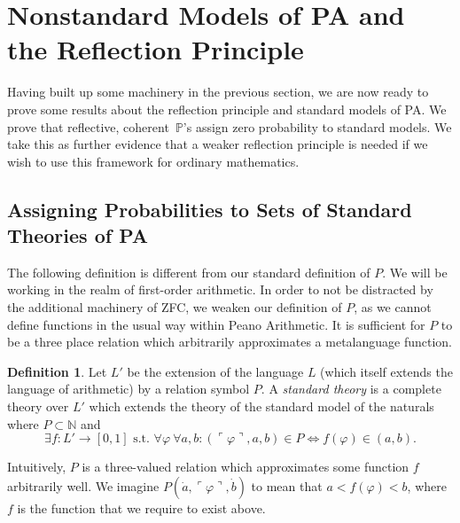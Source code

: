\documentclass[12pt]{article}
\newcommand{\PP}{\mathbb{P}}
\newcommand{\vp}{\varphi}
\theoremstyle{plain}
\theoremstyle{definition}
\newtheorem{definition}[theorem]{Definition}
\theoremstyle{remark}
\begin{document}
\section{Nonstandard Models of PA and the Reflection Principle}
\label{nonstandard-models}
Having built up some machinery in the previous section, we are now ready to prove some results about the reflection principle and standard models of PA. We prove that reflective, coherent~$\PP$'s  assign zero probability to standard models. We take this as further evidence that a weaker reflection principle is needed if we wish to use this framework for ordinary mathematics.
\subsection{Assigning Probabilities to Sets of Standard Theories of PA}
The following definition is different from our standard definition of $P$. 
We will be working in the realm of first-order arithmetic.
In order to not be distracted by the additional machinery of ZFC, we weaken our definition of $P$, as we cannot define functions in the usual way within Peano Arithmetic.
It is sufficient for $P$ to be a three place relation which arbitrarily approximates a metalanguage function.
\begin{definition}
Let $L'$ be the extension of the language $L$ (which itself extends the language of arithmetic) by a relation symbol $P$.
A \emph{standard theory} is a complete theory over $L'$ which extends the theory of the standard model of the naturals where $P\subset\mathbb{N}$ and 
$$\exists f : L'\rightarrow[0, 1] \text{ s.t. } \forall \vp~\forall a, b: (\ulcorner \vp \urcorner, a, b) \in P \iff f(\vp) \in (a, b).$$
\end{definition}
Intuitively, $P$ is a three-valued relation which approximates some function $f$ arbitrarily well. We imagine $P(\dot a,\ulcorner\varphi\urcorner,\dot b)$ to mean that $a<f(\varphi)<b$, where $f$ is the function that we require to exist above.
\end{document}
